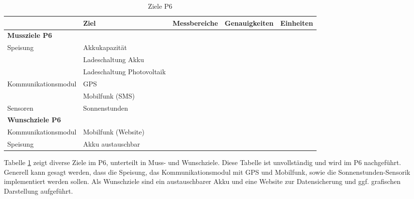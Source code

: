 \begin{landscape}
\newpage
\begin{table}[htbp]
  \centering
  \caption{Ziele P6}
    \begin{tabular}{l|l|r|r|r}
          & \textbf{Ziel} & \multicolumn{1}{l|}{\textbf{Messbereiche}} & \multicolumn{1}{l|}{\textbf{Genauigkeiten}} & \multicolumn{1}{l}{\textbf{Einheiten}} \\
    \toprule
    \multicolumn{1}{l}{\textbf{Mussziele P6}} & \multicolumn{1}{r}{} & \multicolumn{1}{r}{} & \multicolumn{1}{r}{} &  \\
    \toprule
    Speisung & Akkukapazität &       &       &  \\
\cline{2-5}          & Ladeschaltung Akku &       &       &  \\
\cline{2-5}           & Ladeschaltung Photovoltaik &       &       &  \\
    \hline
    Kommunikationsmodul & GPS   &       &       &  \\
\cline{2-5}          & Mobilfunk (SMS) &       &       &  \\
\hline
Sensoren & Sonnenstunden &       &       &  \\
    \bottomrule
    \multicolumn{1}{l}{\textbf{Wunschziele P6}} & \multicolumn{1}{r}{} & \multicolumn{1}{r}{} & \multicolumn{1}{r}{} &  \\
    \toprule
    Kommunikationsmodul & Mobilfunk (Website) &       &       &  \\
    \hline
    Speisung & Akku austauschbar &       &       &  \\
    \bottomrule
    \end{tabular}%
  \label{tab:ZieleP6}%
\end{table}%

\noindent
Tabelle \ref{tab:ZieleP6} zeigt diverse Ziele im P6, unterteilt in Muss- und Wunschziele. Diese Tabelle ist unvollständig und wird im P6 nachgeführt. Generell kann gesagt werden, dass die Speisung, das Kommunikationsmodul mit GPS und Mobilfunk, sowie die Sonnenstunden-Sensorik implementiert werden sollen. Als Wunschziele sind ein austauschbarer Akku und eine Website zur Datensicherung und ggf. grafischen Darstellung aufgeführt.
\end{landscape}
